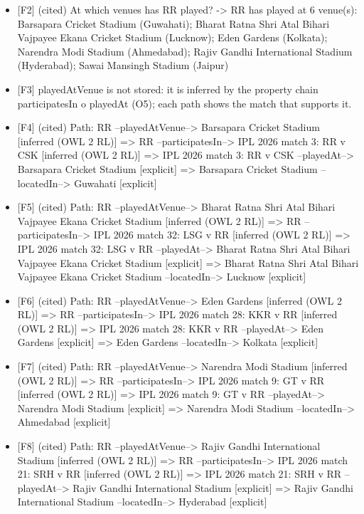 \begin{itemize}\setlength\itemsep{0pt}\footnotesize
\item{} [F2] (cited) At which venues has RR played? -\textgreater{} RR has played at 6 venue(s): Barsapara Cricket Stadium (Guwahati); Bharat Ratna Shri Atal Bihari Vajpayee Ekana Cricket Stadium (Lucknow); Eden Gardens (Kolkata); Narendra Modi Stadium (Ahmedabad); Rajiv Gandhi International Stadium (Hyderabad); Sawai Mansingh Stadium (Jaipur)
\item{} [F3] playedAtVenue is not stored: it is inferred by the property chain participatesIn o playedAt (O5); each path shows the match that supports it.
\item{} [F4] (cited) Path: RR --playedAtVenue--\textgreater{} Barsapara Cricket Stadium [inferred (OWL 2 RL)] =\textgreater{} RR --participatesIn--\textgreater{} IPL 2026 match 3: RR v CSK [inferred (OWL 2 RL)] =\textgreater{} IPL 2026 match 3: RR v CSK --playedAt--\textgreater{} Barsapara Cricket Stadium [explicit] =\textgreater{} Barsapara Cricket Stadium --locatedIn--\textgreater{} Guwahati [explicit]
\item{} [F5] (cited) Path: RR --playedAtVenue--\textgreater{} Bharat Ratna Shri Atal Bihari Vajpayee Ekana Cricket Stadium [inferred (OWL 2 RL)] =\textgreater{} RR --participatesIn--\textgreater{} IPL 2026 match 32: LSG v RR [inferred (OWL 2 RL)] =\textgreater{} IPL 2026 match 32: LSG v RR --playedAt--\textgreater{} Bharat Ratna Shri Atal Bihari Vajpayee Ekana Cricket Stadium [explicit] =\textgreater{} Bharat Ratna Shri Atal Bihari Vajpayee Ekana Cricket Stadium --locatedIn--\textgreater{} Lucknow [explicit]
\item{} [F6] (cited) Path: RR --playedAtVenue--\textgreater{} Eden Gardens [inferred (OWL 2 RL)] =\textgreater{} RR --participatesIn--\textgreater{} IPL 2026 match 28: KKR v RR [inferred (OWL 2 RL)] =\textgreater{} IPL 2026 match 28: KKR v RR --playedAt--\textgreater{} Eden Gardens [explicit] =\textgreater{} Eden Gardens --locatedIn--\textgreater{} Kolkata [explicit]
\item{} [F7] (cited) Path: RR --playedAtVenue--\textgreater{} Narendra Modi Stadium [inferred (OWL 2 RL)] =\textgreater{} RR --participatesIn--\textgreater{} IPL 2026 match 9: GT v RR [inferred (OWL 2 RL)] =\textgreater{} IPL 2026 match 9: GT v RR --playedAt--\textgreater{} Narendra Modi Stadium [explicit] =\textgreater{} Narendra Modi Stadium --locatedIn--\textgreater{} Ahmedabad [explicit]
\item{} [F8] (cited) Path: RR --playedAtVenue--\textgreater{} Rajiv Gandhi International Stadium [inferred (OWL 2 RL)] =\textgreater{} RR --participatesIn--\textgreater{} IPL 2026 match 21: SRH v RR [inferred (OWL 2 RL)] =\textgreater{} IPL 2026 match 21: SRH v RR --playedAt--\textgreater{} Rajiv Gandhi International Stadium [explicit] =\textgreater{} Rajiv Gandhi International Stadium --locatedIn--\textgreater{} Hyderabad [explicit]
\end{itemize}
